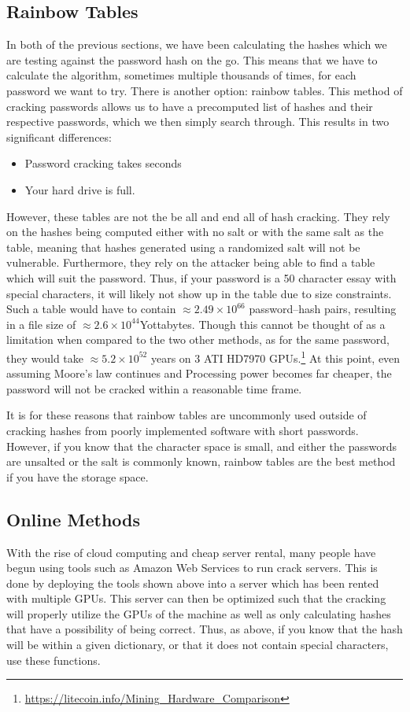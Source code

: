 \documentclass[a4paper,11pt]{report}
\begin{document}
		\subsection{Rainbow Tables}
			In both of the previous sections, we have been calculating the hashes which we are testing against the password hash on the go. 
			This means that we have to calculate the algorithm, sometimes multiple thousands of times, for each password we want to try. 
			There is another option: rainbow tables. 
			This method of cracking passwords allows us to have a precomputed list of hashes and their respective passwords, which we then simply search through. 
			This results in two significant differences:
			\begin{itemize}
				\item Password cracking takes seconds
				\item Your hard drive is full. 
			\end{itemize}
			However, these tables are not the be all and end all of hash cracking. 
			They rely on the hashes being computed either with no salt or with the same salt as the table, meaning that hashes generated using a randomized salt will not be vulnerable. 
			Furthermore, they rely on the attacker being able to find a table which will suit the password. 
			Thus, if your password is a 50 character essay with special characters, it will likely not show up in the table due to size constraints. 
			Such a table would have to contain $\approx2.49\times10^{66}$ password--hash pairs, resulting in a file size of $\approx2.6\times10^{44}$Yottabytes.
			Though this cannot be thought of as a limitation when compared to the two other methods, as for the same password, they would take $\approx5.2\times10^{52}$ years on 3 ATI HD7970 GPUs.\footnote{\url{https://litecoin.info/Mining\_Hardware\_Comparison}}
			At this point, even assuming Moore's law continues and Processing power becomes far cheaper, the password will not be cracked within a reasonable time frame. 

			It is for these reasons that rainbow tables are uncommonly used outside of cracking hashes from poorly implemented software with short passwords. 
			However, if you know that the character space is small, and either the passwords are unsalted or the salt is commonly known, rainbow tables are the best method if you have the storage space. 
		\subsection{Online Methods}
			With the rise of cloud computing and cheap server rental, many people have begun using tools such as Amazon Web Services to run crack servers. 
			This is done by deploying the tools shown above into a server which has been rented with multiple GPUs. 
			This server can then be optimized such that the cracking will properly utilize the GPUs of the machine as well as only calculating hashes that have a possibility of being correct. 
			Thus, as above, if you know that the hash will be within a given dictionary, or that it does not contain special characters, use these functions. 
\end{document}
